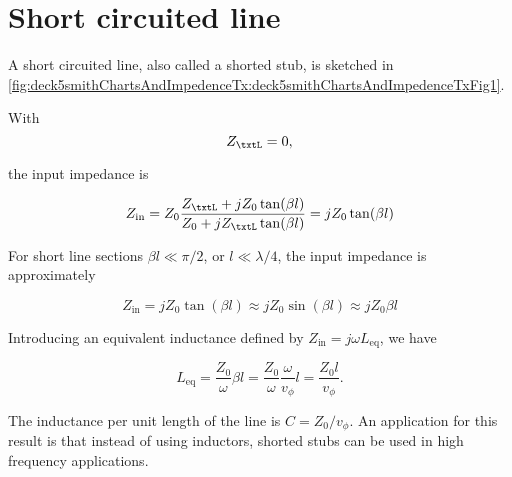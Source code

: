%
%

\section{Short circuited line}

A short circuited line, also called a shorted stub, is sketched in \cref{fig:deck5smithChartsAndImpedenceTx:deck5smithChartsAndImpedenceTxFig1}.


With 
\begin{equation}\label{eqn:uwavesDeck5SmithChartCore:20}
Z_\txtL = 0,
\end{equation}

the input impedance is

\begin{equation}\label{eqn:uwavesDeck5SmithChartCore:40}
Z_{\textrm{in}} 
= Z_0 \frac{ Z_\txtL + j Z_0 \tan(\beta l) }{ Z_0 + j Z_\txtL \tan(\beta l)}
= j Z_0 \tan(\beta l)
\end{equation}

%
%

For short line sections \( \beta l \ll \pi/2 \), or \( l \ll \lambda/4 \), the input impedance is approximately

\begin{dmath}\label{eqn:uwavesDeck5SmithChartCore:80}
Z_{\textrm{in}} 
= j Z_0 \tan(\beta l)
\approx j Z_0 \sin(\beta l)
\approx j Z_0 \beta l
\end{dmath}

Introducing an equivalent inductance defined by \( Z_{\textrm{in}} = j \omega L_{\mathrm{eq}} \), we have

\begin{dmath}\label{eqn:uwavesDeck5SmithChartCore:100}
L_{\mathrm{eq}}
=
\frac{Z_0}{\omega} \beta l 
=
\frac{Z_0}{\omega} \frac{\omega}{v_\phi} l 
=
\frac{Z_0 l}{v_\phi}.
\end{dmath}

The inductance per unit length of the line is \( C = Z_0/v_\phi \).  An application for this result is that instead of using inductors, shorted stubs can be used in high frequency applications.

